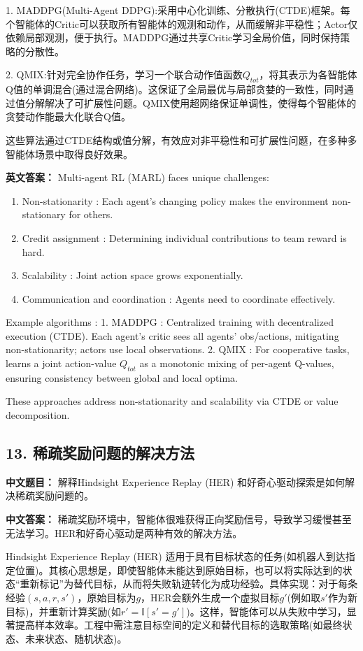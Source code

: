 \documentclass[10pt,a4paper]{ctexart}
\begin{document}
1.  MADDPG(Multi-Agent DDPG):采用中心化训练、分散执行(CTDE)框架。每个智能体的Critic可以获取所有智能体的观测和动作，从而缓解非平稳性；Actor仅依赖局部观测，便于执行。MADDPG通过共享Critic学习全局价值，同时保持策略的分散性。

2.  QMIX:针对完全协作任务，学习一个联合动作值函数\(Q_{tot}\)，将其表示为各智能体Q值的单调混合(通过混合网络)。这保证了全局最优与局部贪婪的一致性，同时通过值分解解决了可扩展性问题。QMIX使用超网络保证单调性，使得每个智能体的贪婪动作能最大化联合Q值。

这些算法通过CTDE结构或值分解，有效应对非平稳性和可扩展性问题，在多种多智能体场景中取得良好效果。

\textbf{英文答案：}  
Multi-agent RL (MARL) faces unique challenges:
\begin{enumerate}
    \item Non-stationarity : Each agent's changing policy makes the environment non-stationary for others.
    \item Credit assignment : Determining individual contributions to team reward is hard.
    \item Scalability : Joint action space grows exponentially.
    \item Communication and coordination : Agents need to coordinate effectively.
\end{enumerate}

 Example algorithms :
1.  MADDPG : Centralized training with decentralized execution (CTDE). Each agent's critic sees all agents' obs/actions, mitigating non-stationarity; actors use local observations.
2.  QMIX : For cooperative tasks, learns a joint action-value \(Q_{tot}\) as a monotonic mixing of per-agent Q-values, ensuring consistency between global and local optima.

These approaches address non-stationarity and scalability via CTDE or value decomposition.

\subsection*{13. 稀疏奖励问题的解决方法}
\textbf{中文题目：} 解释Hindsight Experience Replay (HER) 和好奇心驱动探索是如何解决稀疏奖励问题的。

\textbf{中文答案：}  
稀疏奖励环境中，智能体很难获得正向奖励信号，导致学习缓慢甚至无法学习。HER和好奇心驱动是两种有效的解决方法。

 Hindsight Experience Replay (HER)  适用于具有目标状态的任务(如机器人到达指定位置)。其核心思想是，即使智能体未能达到原始目标，也可以将实际达到的状态“重新标记”为替代目标，从而将失败轨迹转化为成功经验。具体实现：对于每条经验\((s,a,r,s')\)，原始目标为\(g\)，HER会额外生成一个虚拟目标\(g'\)(例如取\(s'\)作为新目标)，并重新计算奖励(如\(r' = \mathbb{I}[s' = g']\))。这样，智能体可以从失败中学习，显著提高样本效率。工程中需注意目标空间的定义和替代目标的选取策略(如最终状态、未来状态、随机状态)。
\end{document}
